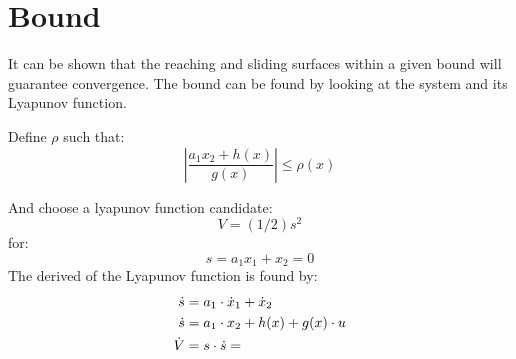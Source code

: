 \section{Bound} %
\label{sec:bound}
It can be shown that the reaching and sliding surfaces within a given bound will guarantee convergence. The bound can be found by looking at the system and its Lyapunov function.

Define $\rho$ such that:
\begin{equation}
        \left \vert \frac{a_1 x_2 + h(x)}{g(x)} \right \vert \leq \rho(x) 
\end{equation}

And choose a lyapunov function candidate:
\begin{equation}
        V=(1/2)s^2
\end{equation}
for:
\begin{equation}
        s=a_1 x_1+ x_2 = 0
\end{equation}
The derived of the Lyapunov function is found by:
\begin{equation}
        \begin{split}
                \dot{s} &= a_1 \cdot \dot{x}_1 + \dot{x}_2 \\
                \dot{s} &= a_1 \cdot x_2 + h(x) + g(x) \cdot u\\
                \dot{V} &= s \cdot \dot{s} = 
        \end{split}
\end{equation}
        


